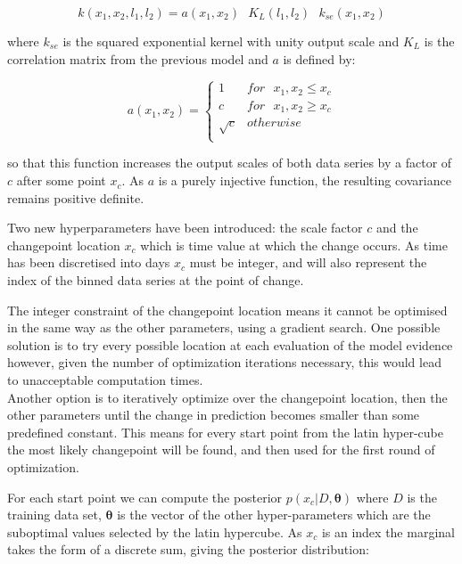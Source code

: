 \documentclass[a4paper,11pt]{report}
\begin{document}
\begin{equation} \label{eq:outputcpcov}
k(x_1,x_2,l_1,l_2) = a(x_1,x_2)\text{ } K_L(l_1,l_2) \text{ }k_{se}(x_1,x_2)
\end{equation}

where \(k_{se}\) is the squared exponential kernel with unity output scale and \(K_L\) is the correlation matrix from the previous model and \(a\) is defined by:

\singlespacing
\begin{equation} 
a(x_1,x_2) = \begin{cases}
1 & for \text{ } x_1, x_2 \leq x_c \\
c & for \text{ } x_1, x_2 \geq x_c \\ 
\sqrt{c} & otherwise \\ 
\end{cases}
\end{equation}
\doublespacing

so that this function increases the output scales of both data series by a factor of \(c\) after some point \(x_c\). As \(a\) is a purely injective function, the resulting covariance remains positive definite. \par

Two new hyperparameters have been introduced: the scale factor \(c\) and the changepoint location \(x_c\) which is time value at which the change occurs. As time has been discretised into days \(x_c\) must be integer, and will also represent the index of the binned data series at the point of change. \par
The integer constraint of the changepoint location means it cannot be optimised in the same way as the other parameters, using a gradient search. One possible solution is to try every possible location at each evaluation of the model evidence however, given the number of optimization iterations necessary, this would lead to unacceptable computation times. \\

Another option is to iteratively optimize over the changepoint location, then the other parameters until the change in prediction becomes smaller than some predefined constant. This means for every start point from the latin hyper-cube the most likely changepoint will be found, and then used for the first round of optimization. 

For each start point we can compute the posterior \(p(x_c | D, \boldsymbol{\theta})\) where \(D\) is the training data set, \(\boldsymbol{\theta}\) is the vector of the other hyper-parameters which are the suboptimal values selected by the latin hypercube. As \(x_c\) is an index the marginal takes the form of a discrete sum, giving the posterior distribution:
\end{document}
